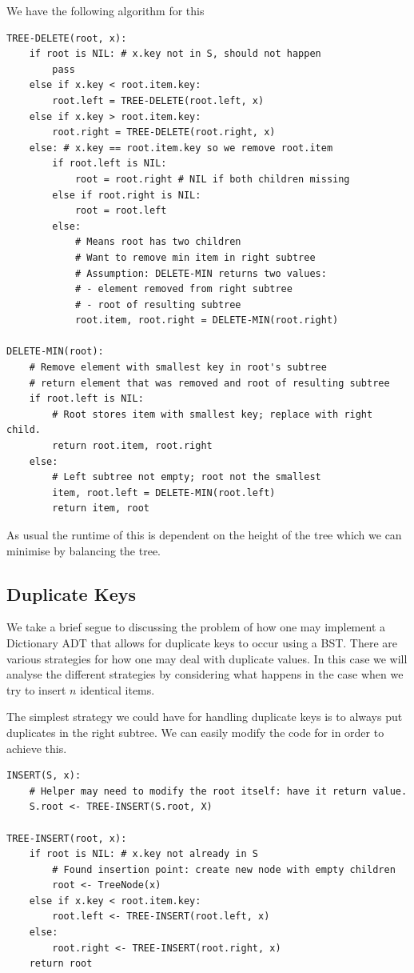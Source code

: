 We have the following algorithm for this
\begin{lstlisting}
TREE-DELETE(root, x):
    if root is NIL: # x.key not in S, should not happen
        pass
    else if x.key < root.item.key:
        root.left = TREE-DELETE(root.left, x)
    else if x.key > root.item.key:
        root.right = TREE-DELETE(root.right, x)
    else: # x.key == root.item.key so we remove root.item
        if root.left is NIL:
            root = root.right # NIL if both children missing
        else if root.right is NIL:
            root = root.left
        else:
            # Means root has two children
            # Want to remove min item in right subtree
            # Assumption: DELETE-MIN returns two values:
            # - element removed from right subtree
            # - root of resulting subtree
            root.item, root.right = DELETE-MIN(root.right)
            
DELETE-MIN(root):
    # Remove element with smallest key in root's subtree
    # return element that was removed and root of resulting subtree
    if root.left is NIL:
        # Root stores item with smallest key; replace with right child.
        return root.item, root.right
    else:
        # Left subtree not empty; root not the smallest
        item, root.left = DELETE-MIN(root.left)
        return item, root
\end{lstlisting}

As usual the runtime of this is dependent on the height of the tree which we can minimise by balancing the tree.

\subsection{Duplicate Keys}
We take a brief segue to discussing the problem of how one may implement a Dictionary ADT that allows for duplicate keys to occur using a BST. There are various strategies for how one may deal with duplicate values. In this case we will analyse the different strategies by considering what happens in the case when we try to insert $n$ identical items. 

The simplest strategy we could have for handling duplicate keys is to always put duplicates in the right subtree. We can easily modify the code for  in order to achieve this.

\begin{lstlisting}
INSERT(S, x):
    # Helper may need to modify the root itself: have it return value.
    S.root <- TREE-INSERT(S.root, X)
    
TREE-INSERT(root, x):
    if root is NIL: # x.key not already in S
        # Found insertion point: create new node with empty children
        root <- TreeNode(x)
    else if x.key < root.item.key:
        root.left <- TREE-INSERT(root.left, x)
    else:
        root.right <- TREE-INSERT(root.right, x)
    return root
\end{lstlisting}

